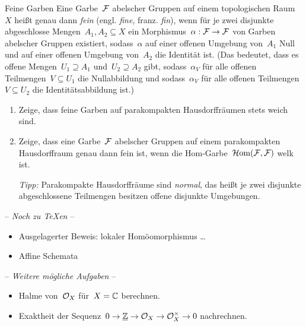 \documentclass{uebblatt}
\begin{document}
\begin{aufgabe}{Feine Garben}
Eine Garbe~$\mathcal{F}$ abelscher Gruppen auf einem topologischen Raum~$X$ heißt genau dann \emph{fein}
(engl. \emph{fine}, franz. \emph{fin}), wenn für je zwei disjunkte abgeschlosse
Mengen~$A_1, A_2 \subseteq X$ ein Morphismus~$\alpha : \mathcal{F} \to \mathcal{F}$ von Garben
abelscher Gruppen existiert, sodass~$\alpha$ auf einer offenen Umgebung
von~$A_1$ Null und auf einer offenen Umgebung von~$A_2$ die Identität ist.
(Das bedeutet, dass es offene Mengen~$U_1 \supseteq A_1$
und~$U_2 \supseteq A_2$ gibt, sodass~$\alpha_V$ für alle offenen Teilmengen~$V
\subseteq U_1$ die Nullabbildung und sodass~$\alpha_V$ für alle offenen
Teilmengen~$V \subseteq U_2$ die Identitätsabbildung ist.)

\begin{enumerate}
\item Zeige, dass feine Garben auf parakompakten Hausdorffräumen stets weich
sind.
\item Zeige, dass eine Garbe~$\mathcal{F}$ abelscher Gruppen auf einem parakompakten
Hausdorffraum genau dann fein ist, wenn die Hom-Garbe~$\mathcal{H}\mathrm{om}(\mathcal{F},\mathcal{F})$ welk ist.

\emph{Tipp:} Parakompakte Hausdorffräume sind \emph{normal}, das heißt
je zwei disjunkte abgeschlossene Teilmengen besitzen offene disjunkte
Umgebungen.
\end{enumerate}
\end{aufgabe}

\begin{center}-- \emph{Noch zu \TeX{}en} --\end{center}
\begin{itemize}
\item Ausgelagerter Beweis: lokaler Homöomorphismus \ldots
\item Affine Schemata
\end{itemize}

\begin{center}-- \emph{Weitere mögliche Aufgaben} --\end{center}
\begin{itemize}
\item Halme von~$\mathcal{O}_X$ für~$X = \mathbb{C}$ berechnen.
\item Exaktheit der Sequenz~$0 \to \underline{\mathbb{Z}} \to \mathcal{O}_X \to \mathcal{O}_X^\times \to 0$
nachrechnen.
\end{itemize}
\end{document}
